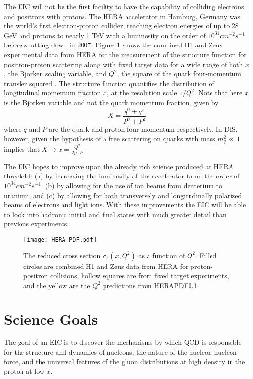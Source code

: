 The EIC will not be the first facility to have the capability of colliding electrons and positrons with protons. The HERA accelerator in Hamburg, Germany was the world's first electron-proton collider, reaching electron energies of up to 28 GeV and protons to nearly 1 TeV with a luminosity on the order of $10^{31}\unit{cm}^{-2}\unit{s}^{-1}$ before shutting down in 2007. Figure \ref{fig:HERA_pdf} shows the combined H1 and Zeus experimental data from HERA for the measurement of the structure function for positron-proton scattering along with fixed target data for a wide range of both $x$, the Bjorken scaling variable, and $Q^2$, the square of the quark four-momentum transfer squared \cite{HERAStructureFunction}. The structure function quantifies the distribution of longitudinal momentum fraction $x$, at the resolution scale $1/Q^2$. Note that here $x$ is the Bjorken variable and not the quark momentum fraction, given by
%
\begin{equation}
X = \frac{q^0 + q^z}{P^0 + P^z}
\label{eq:momFrac}
\end{equation}
%
where $q$ and $P$ are the quark and proton four-momentum respectively. In DIS, however, given the hypothesis of a free scattering on quarks with mass $m_q^2 \ll 1$ implies that $X \rightarrow x = \frac{Q^2}{2p\cdot P}$.

The EIC hopes to improve upon the already rich science produced at HERA threefold: (a) by increasing the luminosity of the accelerator to on the order of $10^{34}\unit{cm}^{-2}\unit{s}^{-1}$, (b) by allowing for the use of ion beams from deuterium to uranium, and (c) by allowing for both transversely and longitudinally polarized beams of electrons and light ions. With these improvements the EIC will be able to look into hadronic initial and final states with much greater detail than previous experiments.

\begin{figure}[!htb]
	\centering
	\texttt{[image: HERA\_PDF.pdf]}
	\caption{The reduced cross section $\sigma_{r}(x,Q^2)$ as a function of $Q^2$. Filled circles are combined H1 and Zeus data from HERA for proton-positron collisions, hollow squares are from fixed target experiments, and the yellow are the $Q^2$ predictions from HERAPDF0.1.}
	\label{fig:HERA_pdf}
\end{figure}

\section{Science Goals}
The goal of an EIC is to discover the mechanisms by which QCD is responsible for the structure and dynamics of nucleons, the nature of the nucleon-nucleon force, and the universal features of the gluon distributions at high density in the proton at low $x$.


